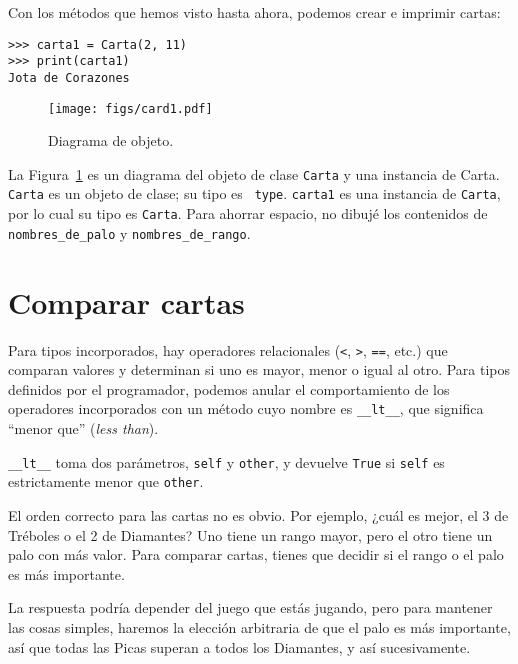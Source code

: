 \documentclass[10pt]{book}
\begin{document}
Con los métodos que hemos visto hasta ahora, podemos crear e imprimir cartas:

\begin{verbatim}
>>> carta1 = Carta(2, 11)
>>> print(carta1)
Jota de Corazones
\end{verbatim}

\begin{figure}
\centerline
{\texttt{[image: figs/card1.pdf]}}
\caption{Diagrama de objeto.}
\label{fig.card1}
\end{figure}

La Figura~\ref{fig.card1} es un diagrama del objeto de clase {\tt Carta} y
una instancia de Carta.  {\tt Carta} es un objeto de clase; su tipo es {\tt
  type}.  {\tt carta1} es una instancia de {\tt Carta}, por lo cual su tipo es
{\tt Carta}.  Para ahorrar espacio, no dibujé los contenidos de
\verb"nombres_de_palo" y \verb"nombres_de_rango".  
  


\section{Comparar cartas}
\label{comparecard}

Para tipos incorporados, hay operadores relacionales
({\tt <}, {\tt >}, {\tt ==}, etc.)
que comparan
valores y determinan si uno es mayor, menor o igual al
otro.  Para tipos definidos por el programador, podemos anular el comportamiento de
los operadores incorporados con un método cuyo nombre es
\verb"__lt__", que significa ``menor que'' ({\em less than}).

\verb"__lt__" toma dos parámetros, {\tt self} y {\tt other},
y devuelve {\tt True} si {\tt self} es estrictamente menor que {\tt other}.

El orden correcto para las cartas no es obvio.
Por ejemplo, ¿cuál
es mejor, el 3 de Tréboles o el 2 de Diamantes?  Uno tiene un rango
mayor, pero el otro tiene un palo con más valor.  Para comparar
cartas, tienes que decidir si el rango o el palo es más importante.

La respuesta podría depender del juego que estás jugando, pero para mantener
las cosas simples, haremos la elección arbitraria de que el palo es más
importante, así que todas las Picas superan a todos los Diamantes,
y así sucesivamente.
\end{document}
